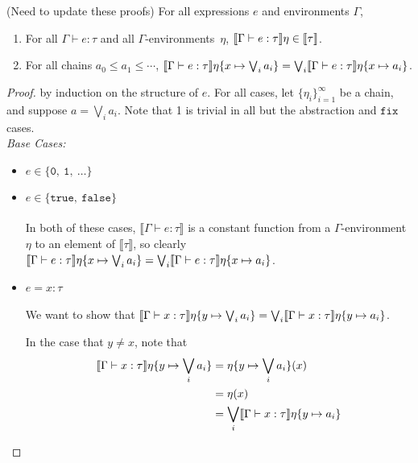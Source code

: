\begin{thm} 
(Need to update these proofs)
For all expressions $e$ and environments $\Gamma$,
\begin{enumerate}
\item For all $\Gamma\vdash e : \tau$ and all $\Gamma$-environments~$\eta$,
$\llbracket{{\Gamma}\vdash{e}:{\tau}}\rrbracket{\eta}\in\llbracket{\tau}\rrbracket$.
\item For all chains $a_0\leq a_1\leq\dotsb$,
$\llbracket{{\Gamma}\vdash{e}:{\tau}}\rrbracket{\eta\{{x}\mapsto{\bigvee_i a_i}\}} =
\bigvee_i\llbracket{{\Gamma}\vdash{e}:{\tau}}\rrbracket{\eta\{{x}\mapsto{a_i}\}}$.
\end{enumerate}
\end{thm}
\begin{proof}
by induction on the structure of $e$. For all cases, let $\{ \eta_i \}^{\infty}_{i=1}$ be a chain, and suppose $ a = \bigvee_i a_i$. 
Note that 1 is trivial in all but the abstraction and $\texttt{fix}$ cases.\\
 \emph{Base Cases: } 
 \begin{itemize}
 \item $e \in \{ \texttt{0}, \ \texttt{1}, \ \ldots \}$
 \item $e \in \{ \texttt{true}, \ \texttt{false} \}$\\ \\
  In both of these cases, $\llbracket \Gamma \vdash e : \tau \rrbracket$ is a constant function from a $\Gamma$-environment
 $\eta$ to an element of $\llbracket \tau \rrbracket$, so clearly $\llbracket{{\Gamma}\vdash{e}:{\tau}}\rrbracket{\eta\{{x}\mapsto{\bigvee_i a_i}\}} =
\bigvee_i\llbracket{{\Gamma}\vdash{e}:{\tau}}\rrbracket{\eta\{{x}\mapsto{a_i}\}}$.

 \item $e = x : \tau$ \\ \\
 We want to show that $\llbracket{{\Gamma}\vdash{x}:{\tau}}\rrbracket{\eta\{{y}\mapsto{\bigvee_i a_i}\}} =
\bigvee_i\llbracket{{\Gamma}\vdash{x}:{\tau}}\rrbracket{\eta\{{y}\mapsto{a_i}\}}$.

In the case that $ y \neq x$, note that
\begin{align*}
\llbracket{{\Gamma}\vdash{x}:{\tau}}\rrbracket{\eta\{{y}\mapsto{\bigvee_i a_i}\}} &= \eta\{y\mapsto \bigvee_i a_i\}(x) \\
&= \eta (x) \\
&= \bigvee_i\llbracket{{\Gamma}\vdash{x}:{\tau}}\rrbracket{\eta\{{y}\mapsto{a_i}\}}
\end{align*}


\end{itemize}
\end{proof}
